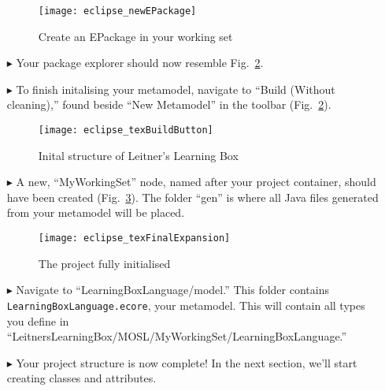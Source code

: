 \begin{itemize}
\vspace{0.5cm}

\begin{figure}[htbp]
	\centering
  \texttt{[image: eclipse\_newEPackage]}
	\caption{Create an EPackage in your working set}
	\label{fig:new_EPackage}
\end{figure} 

\clearpage

\item[$\blacktriangleright$] Your package explorer should now resemble Fig.~\ref{fig:preBuild}.

\item[$\blacktriangleright$] To finish initalising your metamodel, navigate to ``Build (Without cleaning),'' found beside ``New Metamodel'' in the
toolbar (Fig.~\ref{fig:preBuild}).

\begin{figure}[htbp]
	\centering
  \texttt{[image: eclipse\_texBuildButton]}
	\caption{Inital structure of Leitner's Learning Box}
	\label{fig:preBuild}
\end{figure} 

\vspace{0.5cm}

\item[$\blacktriangleright$] A new, ``MyWorkingSet'' node, named after your project container, should have been created (Fig.~\ref{fig:finalFiles}). The folder
``gen'' is where all Java files generated from your metamodel will be placed.

\vspace{0.5cm}

\begin{figure}[h!]
	\centering
  \texttt{[image: eclipse\_texFinalExpansion]}
	\caption{The project fully initialised}
	\label{fig:finalFiles}
\end{figure} 

\vspace{0.5cm}

\item[$\blacktriangleright$] Navigate to ``LearningBoxLanguage/model.'' This folder contains \\ \texttt{LearningBoxLanguage.ecore}, your metamodel. This will
contain all types you define in ``LeitnersLearningBox/MOSL/MyWorkingSet/LearningBoxLanguage.''

\item[$\blacktriangleright$] Your project structure is now complete! In the next section, we'll start creating classes and attributes.


\end{itemize}
